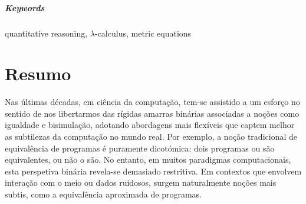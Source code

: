 \begin{comment}
On the semantic side, we show that the following categories satisfy the necessary requirements for interpreting this equation:
\begin{itemize}
    \item the category of metric spaces;
    \item the cocompletion of a $\catMet$-category $\catC$;
    \item the category $\catBan$ of Banach spaces and short maps;
    \item Selinger’s category \( \catQ \) of quantum operations (i.e., completely positive, trace-nonincreasing superoperators)~\cite{selinger2004towards};
    \item Cho’s category \( \WstarCPSUop \), the opposite of \( \WstarCPSU \), consisting of W$^*$-algebras and normal, completely positive, subunital maps.
\end{itemize}
This demonstrates the broad applicability of our approach across several domains.
\end{comment}




\paragraph{Keywords} quantitative reasoning, $\lambda$-calculus, metric equations

\cleardoublepage

\chapter*{Resumo}


Nas últimas décadas, em ciência da computação, tem-se assistido a um esforço no sentido de nos libertarmos das rígidas amarras binárias associadas a noções como igualdade e bisimulação, adotando abordagens mais flexíveis que captem melhor as subtilezas da computação no mundo real. Por exemplo, a noção tradicional de equivalência de programas é puramente dicotómica: dois programas ou são equivalentes, ou não o são. No entanto, em muitos paradigmas computacionais, esta perspetiva binária revela-se demasiado restritiva. Em contextos que envolvem interação com o meio ou dados ruidosos, surgem naturalmente noções mais subtis, como a equivalência aproximada de programas. 

